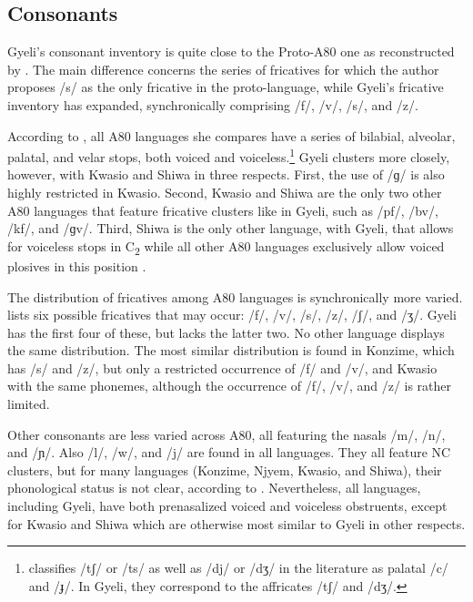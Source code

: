 \subsection{Consonants} Gyeli's consonant inventory is quite close to the Proto-A80 one as reconstructed by \citet[432]{cheucle2014}. The main difference concerns the series of fricatives for which the author proposes /s/ as the only fricative in the proto-language, while Gyeli's fricative inventory has expanded, synchronically comprising /f/, /v/, /s/, and /z/.

 According to \citet[335]{cheucle2014}, all A80 languages she compares have a series of bilabial, alveolar, palatal, and velar stops, both voiced and voiceless.\footnote{\citet[335]{cheucle2014} classifies /tʃ/ or /ts/ as well as /dj/ or /dʒ/ in the literature as palatal /c/ and /ɟ/. In Gyeli, they correspond to the affricates /tʃ/ and /dʒ/.} Gyeli clusters more closely, however, with Kwasio and Shiwa in three respects. First,  the use of /ɡ/ is also highly restricted in Kwasio. Second, Kwasio and Shiwa are the only two other A80 languages that feature fricative clusters like in Gyeli, such as /pf/, /bv/, /kf/, and /ɡv/. Third, Shiwa is the only other language, with Gyeli, that allows for voiceless stops in C\textsubscript{2} while all other A80 languages exclusively allow voiced plosives in this position \citep[340]{cheucle2014}.

The distribution of fricatives among A80 languages is synchronically more varied. \citet[342]{cheucle2014} lists six possible fricatives that may occur: /f/, /v/, /s/, /z/, /ʃ/, and /ʒ/. Gyeli has the first four of these, but lacks the latter two. No other language displays the same distribution. The most similar distribution is found in Konzime, which has /s/ and /z/, but only a restricted occurrence of /f/ and /v/, and Kwasio with the same phonemes, although the occurrence of /f/, /v/, and /z/ is rather limited.

Other consonants are less varied across A80, all featuring the nasals /m/, /n/, and /ɲ/. Also /l/, /w/, and /j/ are found in all languages. They all feature NC clusters, but for many languages (Konzime, Njyem, Kwasio, and Shiwa), their phonological status is not clear, according to \citet[348]{cheucle2014}. Nevertheless, all languages, including Gyeli, have both prenasalized voiced and voiceless obstruents, except for Kwasio and Shiwa which are otherwise most similar to Gyeli in other respects.

